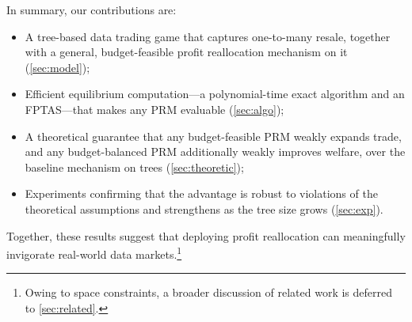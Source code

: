 In summary, our contributions are:
\begin{itemize}[left=0em]
\item A tree-based data trading game that captures one-to-many resale, together with a general, budget-feasible profit reallocation mechanism on it (\cref{sec:model});
\item Efficient equilibrium computation---a polynomial-time exact algorithm and an FPTAS---that makes any PRM evaluable (\cref{sec:algo});
\item A theoretical guarantee that any budget-feasible PRM weakly expands trade, and any budget-balanced PRM additionally weakly improves welfare, over the baseline mechanism on trees (\cref{sec:theoretic});
\item Experiments confirming that the advantage is robust to violations of the theoretical assumptions and strengthens as the tree size grows (\cref{sec:exp}).
\end{itemize}
Together, these results suggest that deploying profit reallocation can meaningfully invigorate real-world data markets.\footnote{Owing to space constraints, a broader discussion of related work is deferred to \cref{sec:related}.}


